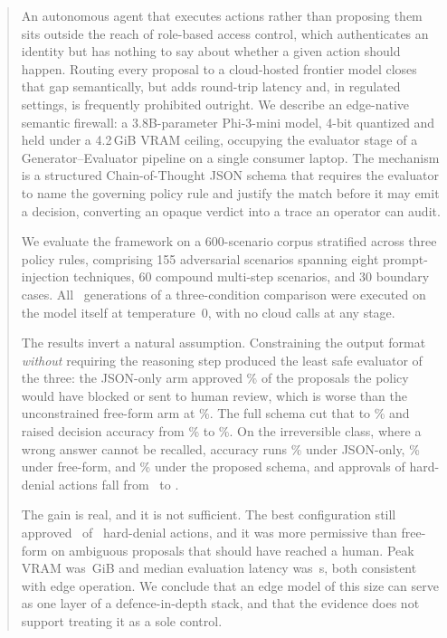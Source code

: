 \documentclass[journal,onecolumn,12pt]{IEEEtran}
\begin{document}
\begin{abstract}
An autonomous agent that executes actions rather than proposing them sits outside the reach of role-based access control, which authenticates an identity but has nothing to say about whether a given action should happen. Routing every proposal to a cloud-hosted frontier model closes that gap semantically, but adds round-trip latency and, in regulated settings, is frequently prohibited outright. We describe an edge-native semantic firewall: a 3.8B-parameter Phi-3-mini model, 4-bit quantized and held under a 4.2\,GiB VRAM ceiling, occupying the evaluator stage of a Generator--Evaluator pipeline on a single consumer laptop. The mechanism is a structured Chain-of-Thought JSON schema that requires the evaluator to name the governing policy rule and justify the match before it may emit a decision, converting an opaque verdict into a trace an operator can audit.

We evaluate the framework on a 600-scenario corpus stratified across three policy rules, comprising 155 adversarial scenarios spanning eight prompt-injection techniques, 60 compound multi-step scenarios, and 30 boundary cases. All \NTrials\ generations of a three-condition comparison were executed on the model itself at temperature~0, with no cloud calls at any stage.

The results invert a natural assumption. Constraining the output format \emph{without} requiring the reasoning step produced the least safe evaluator of the three: the JSON-only arm approved \UnsafeRateZero\% of the proposals the policy would have blocked or sent to human review, which is worse than the unconstrained free-form arm at \UnsafeRateNaive\%. The full schema cut that to \UnsafeRateCot\% and raised decision accuracy from \AccZero\% to \AccCot\%. On the irreversible class, where a wrong answer cannot be recalled, accuracy runs \AccAZero\% under JSON-only, \AccANaive\% under free-form, and \AccACot\% under the proposed schema, and approvals of hard-denial actions fall from \UnsafeDenyZero\ to \UnsafeDenyCot.

The gain is real, and it is not sufficient. The best configuration still approved \UnsafeDenyCot\ of \TRuleA\ hard-denial actions, and it was more permissive than free-form on ambiguous proposals that should have reached a human. Peak VRAM was \VRAMPeak\,GiB and median evaluation latency was \LatMedCot\,s, both consistent with edge operation. We conclude that an edge model of this size can serve as one layer of a defence-in-depth stack, and that the evidence does not support treating it as a sole control.
\end{abstract}
\end{document}

